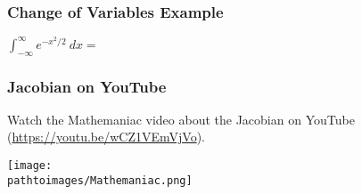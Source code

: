 \documentclass{beamer}
\newcommand{\pathtoimages}{/Users/charlesrambo/Desktop/Bootcamp24/Images}
\begin{document}
\begin{frame}[t]
\frametitle{Change of Variables Example}
\begin{Example}
$\displaystyle\int_{-\infty}^{\infty} e^{-x^2/2}\ dx = $
\end{Example}

\end{frame}

\begin{frame}
\frametitle{Jacobian on YouTube}
\small
Watch the Mathemaniac video about the Jacobian on YouTube (\url{https://youtu.be/wCZ1VEmVjVo}).
\begin{center}
\texttt{[image: \\pathtoimages/Mathemaniac.png]}
\end{center}
\end{frame}
\end{document}
